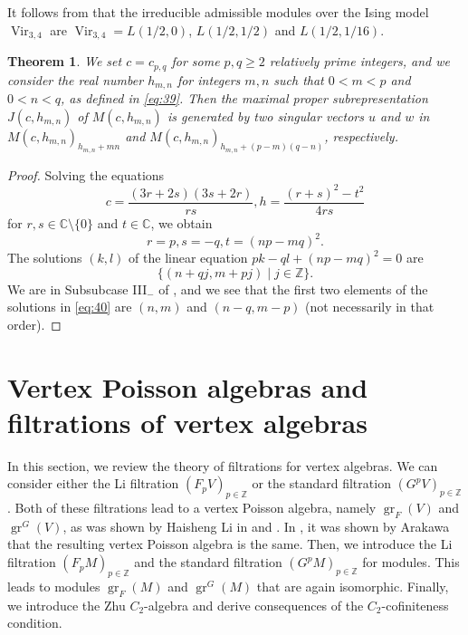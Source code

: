\documentclass[a4paper, 12pt, reqno]{amsart}
\newtheorem{theorem}{Theorem}[section]
\theoremstyle{remark}
\DeclareMathOperator{\Vir}{Vir}
\DeclareMathOperator{\gr}{gr}
\begin{document}
It follows from  that the irreducible admissible modules over the Ising model $\Vir_{3, 4}$ are $\Vir_{3, 4} = L(1/2, 0)$, $L(1/2, 1/2)$ and $L(1/2, 1/16)$.

\begin{theorem}
  \label{thr:45}
  We set $c = c_{p, q}$ for some $p, q \ge 2$ relatively prime integers, and we consider the real number $h_{m, n}$ for integers $m, n$ such that $0 < m < p$ and $0 < n < q$, as defined in \eqref{eq:39}.
  Then the maximal proper subrepresentation $J(c, h_{m, n})$ of $M(c, h_{m, n})$ is generated by two singular vectors $u$ and $w$ in $M(c, h_{m, n})_{h_{m, n} + mn}$ and $M(c, h_{m, n})_{h_{m, n} + (p - m)(q - n)}$, respectively.
\end{theorem}

\begin{proof}
  Solving the equations
  \begin{equation*}
    c = \frac{(3r + 2s)(3s + 2r)}{rs}, h = \frac{(r + s)^2 - t^2}{4rs}
  \end{equation*}
  for $r, s \in \mathbb{C} \setminus \{0\}$ and $t \in \mathbb{C}$, we obtain
  \begin{equation*}
    r = p, s = -q, t = (np - mq)^2.
  \end{equation*}
  The solutions $(k, l)$ of the linear equation $pk - ql + (np - mq)^2 = 0$ are
  \begin{equation}
    \label{eq:40}
    \{(n + qj, m + pj) \mid j \in \mathbb{Z}\}.
  \end{equation}
  We are in Subsubcase III$_-$ of , and we see that the first two elements of the solutions in \eqref{eq:40} are $(n, m)$ and $(n - q, m - p)$ (not necessarily in that order).
\end{proof}

\section{Vertex Poisson algebras and filtrations of vertex algebras}
\label{sec:vert-poiss-algeb}

In this section, we review the theory of filtrations for vertex algebras.
We can consider either the Li filtration $(F_pV)_{p \in \mathbb{Z}}$ or the standard filtration $(G^pV)_{p \in \mathbb{Z}}$.
Both of these filtrations lead to a vertex Poisson algebra, namely $\gr_F(V)$ and $\gr^G(V)$, as was shown by Haisheng Li in \cite{li_abelianizing_2005} and \cite{li_vertex_2004}.
In \cite{arakawa_remark_2012}, it was shown by Arakawa that the resulting vertex Poisson algebra is the same.
Then, we introduce the Li filtration $(F_pM)_{p \in \mathbb{Z}}$ and the standard filtration $(G^pM)_{p \in \mathbb{Z}}$ for modules.
This leads to modules $\gr_F(M)$ and $\gr^G(M)$ that are again isomorphic.
Finally, we introduce the Zhu $C_2$-algebra and derive consequences of the $C_2$-cofiniteness condition.
\end{document}
